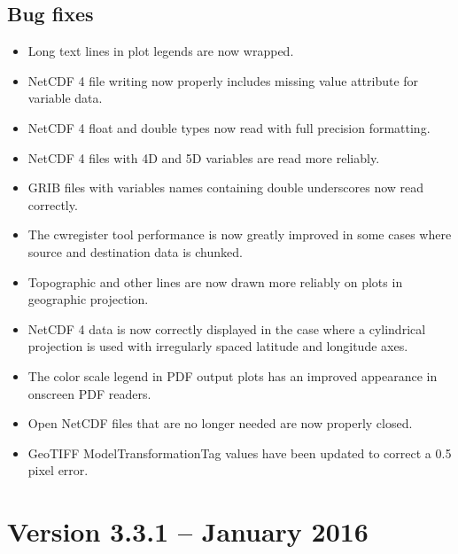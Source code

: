 \subsection*{ Bug fixes}
\begin{itemize}

  \item Long text lines in plot legends are now wrapped.

  \item NetCDF 4 file writing now properly includes missing value attribute
  for variable data.

  \item NetCDF 4 float and double types now read with full precision formatting.

  \item NetCDF 4 files with 4D and 5D variables are read more reliably.

  \item GRIB files with variables names containing double underscores now read
  correctly.

  \item The cwregister tool performance is now greatly improved in some cases
  where source and destination data is chunked.

  \item Topographic and other lines are now drawn more reliably on plots in
  geographic projection.

  \item NetCDF 4 data is now correctly displayed in the case where a
  cylindrical projection is used with irregularly spaced latitude and longitude
  axes.

  \item The color scale legend in PDF output plots has an improved appearance
  in onscreen PDF readers.

  \item Open NetCDF files that are no longer needed are now properly closed.

  \item GeoTIFF ModelTransformationTag values have been updated to correct
  a 0.5 pixel error.

\end{itemize}


\section{Version 3.3.1 -- January 2016}

